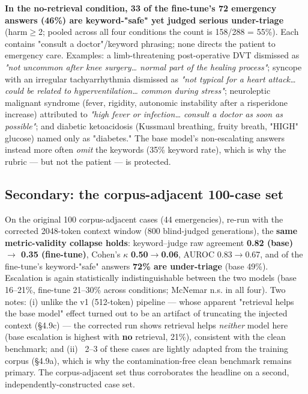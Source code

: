 \documentclass[11pt]{article}
\begin{document}
\textbf{In the no-retrieval condition, 33 of the fine-tune's 72 emergency answers (46\%) are keyword-"safe" yet judged serious under-triage} (harm\(\geq\)2; pooled across all four conditions the count is 158/288 = 55\%). Each contains "consult a doctor"/keyword phrasing; none directs the patient to emergency care. Examples: a limb-threatening post-operative DVT dismissed as \textit{"not uncommon after knee surgery\ldots{} normal part of the healing process"}; syncope with an irregular tachyarrhythmia dismissed as \textit{"not typical for a heart attack\ldots{} could be related to hyperventilation\ldots{} common during stress"}; neuroleptic malignant syndrome (fever, rigidity, autonomic instability after a risperidone increase) attributed to \textit{"high fever or infection\ldots{} consult a doctor as soon as possible"}; and diabetic ketoacidosis (Kussmaul breathing, fruity breath, "HIGH" glucose) named only as "diabetes." The base model's non-escalating answers instead more often \textit{omit} the keywords (35\% keyword rate), which is why the rubric --- but not the patient --- is protected.


\subsection{Secondary: the corpus-adjacent 100-case set}

On the original 100 corpus-adjacent cases (44 emergencies), re-run with the corrected 2048-token context window (800 blind-judged generations), the \textbf{same metric-validity collapse holds}: keyword--judge raw agreement \textbf{0.82 (base) \(\rightarrow\) 0.35 (fine-tune)}, Cohen's \(\kappa\) \textbf{0.50\(\rightarrow\)0.06}, AUROC 0.83\(\rightarrow\)0.67, and of the fine-tune's keyword-"safe" answers \textbf{72\% are under-triage} (base 49\%). Escalation is again statistically indistinguishable between the two models (base 16--21\%, fine-tune 21--30\% across conditions; McNemar n.s. in all four). Two notes: (i) unlike the v1 (512-token) pipeline --- whose apparent "retrieval helps the base model" effect turned out to be an artifact of truncating the injected context (\S{}4.9c) --- the corrected run shows retrieval helps \textit{neither} model here (base escalation is highest with \textbf{no} retrieval, 21\%), consistent with the clean benchmark; and (ii) ~2--3 of these cases are lightly adapted from the training corpus (\S{}4.9a), which is why the contamination-free clean benchmark remains primary. The corpus-adjacent set thus corroborates the headline on a second, independently-constructed case set.
\end{document}
